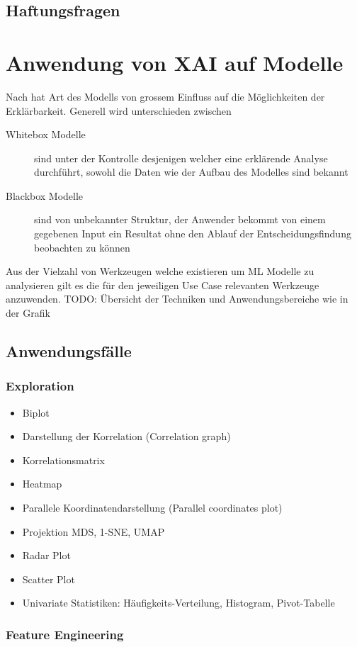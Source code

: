 \documentclass[
  12pt, %
  a4paper, %
  oneside, %
  openany, 
  numbers=noenddot, %
  BCOR=5mm, %
  parskip=half*, %
  thesis, %
]{bfhbook}
\begin{document}
\section{Haftungsfragen}

\chapter{Anwendung von XAI auf Modelle}
Nach \parencite{Oh2019} hat Art des Modells von grossem Einfluss auf die Möglichkeiten der Erklärbarkeit. Generell wird unterschieden zwischen
\begin{description}
\item [Whitebox Modelle] sind unter der Kontrolle desjenigen welcher eine erklärende Analyse durchführt, sowohl die Daten wie der Aufbau des Modelles sind bekannt
\item[Blackbox Modelle] sind von unbekannter Struktur, der Anwender bekommt von einem gegebenen Input ein Resultat ohne den Ablauf der Entscheidungsfindung beobachten zu können
\end{description}

Aus der Vielzahl von Werkzeugen welche existieren um \acrfull{ML} Modelle zu analysieren gilt es die für den jeweiligen Use Case relevanten Werkzeuge anzuwenden.
TODO: Übersicht der Techniken und Anwendungsbereiche wie in der Grafik

\section{Anwendungsfälle}
\subsection{Exploration}
\begin{itemize}
	\item Biplot
	\item Darstellung der Korrelation (Correlation graph)
	\item Korrelationsmatrix
	\item Heatmap
	\item Parallele Koordinatendarstellung (Parallel coordinates plot)
	\item Projektion MDS, 1-SNE, UMAP
	\item Radar Plot
	\item Scatter Plot
	\item Univariate Statistiken: Häufigkeits-Verteilung, Histogram, Pivot-Tabelle
\end{itemize}
\subsection{Feature Engineering}
\end{document}
